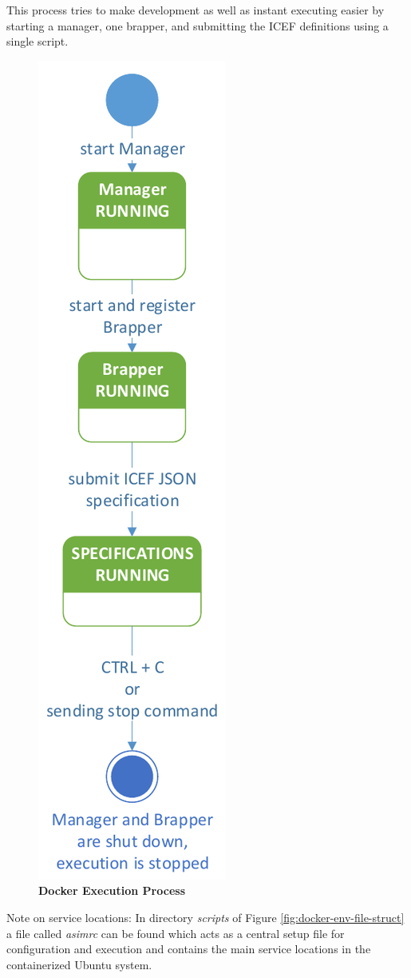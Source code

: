 This process tries to make development as well as instant executing easier by starting a manager, one brapper, and submitting the ICEF definitions using a single script.


\begin{figure}[H]
  \centering
  \includegraphics[height=0.9\textwidth, clip, trim=1mm 1mm 1mm 1mm]{Figures/docker_execute}
  \caption{\bf\small Docker Execution Process}
  \label{fig:docker-env-exec-process}
\end{figure}

Note on service locations: In directory \textit{scripts} of Figure \ref{fig:docker-env-file-struct} a file called \textit{asimrc} can be found which acts as a central setup file for configuration and execution and contains the main service locations in the containerized Ubuntu system.



